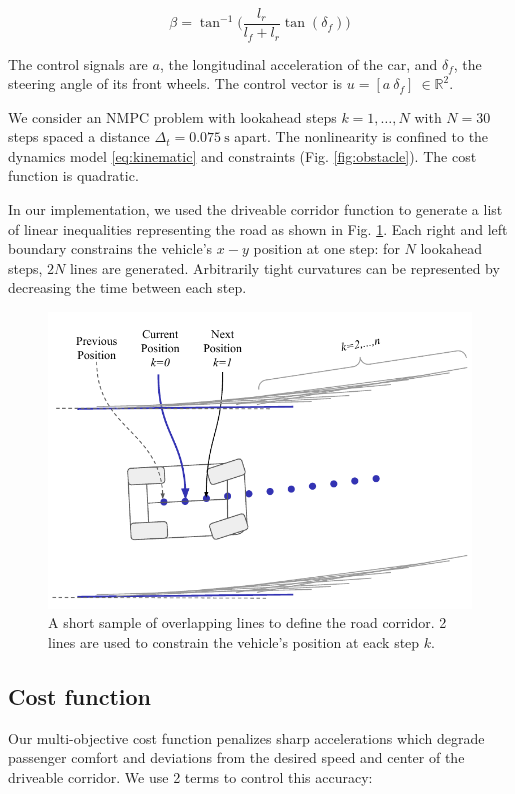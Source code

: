 \documentclass[letterpaper, 10 pt, conference]{ieeeconf}  %
\begin{document}
 \begin{equation}
 \beta = \tan^{-1}\Big( \frac{l_r}{l_f + l_r}\tan(\delta_f) \Big)
 \label{eq:beta}
 \end{equation}
 
 The control signals are $a$, the longitudinal acceleration of the car, and $\delta_f$, the steering angle of its front wheels. The control vector is $u = [a\ \delta_f]\ \in \mathbb{R}^2$.
 
 We consider an NMPC problem with lookahead steps $k=1,\dots,N$ with $N=30$ steps spaced a distance $\Delta_t = 0.075\ \text{s}$ apart. The nonlinearity is confined to the dynamics model \eqref{eq:kinematic} and constraints (Fig. \ref{fig:obstacle}). The cost function is quadratic.
 
In our implementation, we used the driveable corridor function to generate a list of linear inequalities representing the road as shown in Fig. \ref{fig:roadpolygons}. Each right and left boundary constrains the vehicle's $x-y$ position at one step: for $N$ lookahead steps, $2N$ lines are generated. Arbitrarily tight curvatures can be represented by decreasing the time between each step.

 \begin{figure}[h]
 	\centering
 	\includegraphics[width=0.9\linewidth]{figures/road_final_bounds.pdf}
 	\caption{A short sample of overlapping lines to define the road corridor. 2 lines are used to constrain the vehicle's position at eack step $k$.}
 	\label{fig:roadpolygons}
 \end{figure}
 
 \subsection{Cost function}
Our multi-objective cost function penalizes sharp accelerations which degrade passenger comfort and deviations from the desired speed and center of the driveable corridor. We use 2 terms to control this accuracy:
 
\end{document}
